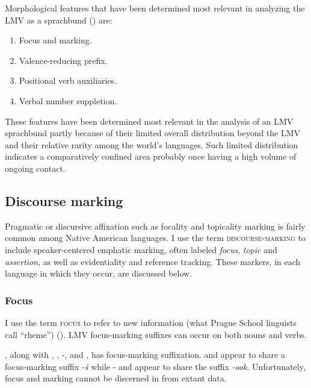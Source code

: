 \documentclass[output=paper]{LSP/langsci}
\begin{document}
	Morphological features that have been determined most relevant in analyzing the LMV as a sprachbund (\citealt[3]{Kaufman2014}) are:

\begin{enumerate}
\item{Focus and  marking.}
\item{Valence-reducing prefix.}
\item{Positional verb auxiliaries.}
\item{Verbal number suppletion.}
\end{enumerate}
 
These features have been determined most relevant in the analysis of an LMV sprachbund partly because of their limited overall distribution beyond the LMV and their relative rarity among the world’s languages. Such limited distribution indicates a comparatively confined area probably once having a high volume of ongoing contact.

\subsection{Discourse marking}

Pragmatic or discursive affixation such as focality and topicality marking is fairly common among Native American languages. I use the term \textsc{discourse-marking} to include speaker-centered emphatic marking, often labeled \emph{focus}, \emph{topic} and \emph{assertion}, as well as evidentiality and reference tracking. These markers, in each language in which they occur, are discussed below.

\subsubsection{Focus}
	
I use the term \textsc{focus} to refer to new information (what Prague School linguists call “rheme”) (\citealt[271]{Payne1997}). LMV focus-marking suffixes can occur on both nouns and verbs.

	, along with , , -, and , has focus-marking suffixation.  and  appear to share a focus-marking suffix \emph{-š} while - and  appear to share the suffix \emph{-ook}. Unfortunately, focus and  marking cannot be discerned in  from extant data.
\end{document}
